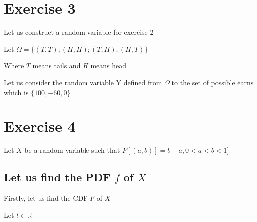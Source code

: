 \documentclass[11pt]{article}
\def\lt{<}
\begin{document}
   
\newpage 
    \section{Exercise 3}
    
    Let us construct a random variable for exercise 2
    
    Let $\Omega=\{(T,T);(H,H); (T,H); (H,T)\}$

Where $T$ means tails and $H$ means head

Let us consider the random variable Y defined from $\Omega$ to the set of possible earns which is $\{100,-60,0\}$
    
\newpage 
    \section{Exercise 4}
    
    Let $X$ be a random variable such that
    $ P[(a, b)] = b − a, 0 \lt a \lt b \lt 1]$
    
    \subsection{Let us find the PDF $f$ of $X$}
    
    Firstly, let us find the CDF $F$ of $X$
    
    Let $t \in \mathbb{R}$
    
\end{document}
